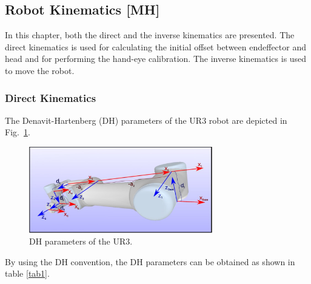 \subsection{Robot Kinematics [MH]}
In this chapter, both the direct and the inverse kinematics are presented.
The direct kinematics is used for calculating the initial offset between endeffector
and head and for performing the hand-eye calibration. The inverse kinematics is used to
move the robot.
\subsubsection{Direct Kinematics}
The Denavit-Hartenberg (DH) parameters of the UR3 robot are depicted in Fig.~\ref{fig1}.
\begin{figure}[htbp]
\centerline{\includegraphics[width=8cm]{DH}}
\caption{DH parameters of the UR3.}
\label{fig1}
\end{figure}

By using the DH convention, the DH parameters can be obtained as shown in table \ref{tab1}.


